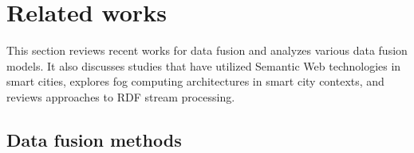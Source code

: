 \documentclass[5p,times]{elsarticle}
\begin{document}



\section{Related works}
This section reviews recent works for data fusion and analyzes various data fusion models. It also discusses studies that have utilized Semantic Web technologies in smart cities, explores fog computing architectures in smart city contexts, and reviews approaches to RDF stream processing.


\subsection{Data fusion methods}


\end{document}
